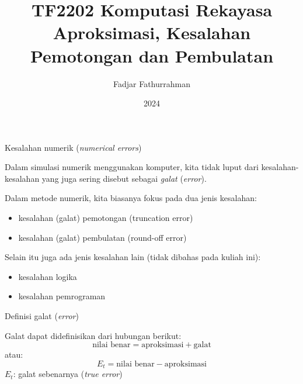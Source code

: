 

\title{TF2202 Komputasi Rekayasa\\
Aproksimasi, Kesalahan Pemotongan dan Pembulatan}
\author{Fadjar Fathurrahman}
\date{2024}



\frame{\titlepage}

\begin{frame}{Kesalahan numerik (\textit{numerical errors})}

Dalam simulasi numerik menggunakan komputer, kita tidak luput dari
kesalahan-kesalahan yang juga sering disebut sebagai
\emph{galat} (\emph{error}).

Dalam metode numerik, kita biasanya fokus pada dua jenis kesalahan:
\begin{itemize}\tightlist
\item kesalahan (galat) pemotongan (truncation error)
\item kesalahan (galat) pembulatan (round-off error)
\end{itemize}

Selain itu juga ada jenis kesalahan lain (tidak dibahas
pada kuliah ini):
\begin{itemize}
\item kesalahan logika
\item kesalahan pemrograman
\end{itemize}

\end{frame}



\begin{frame}{Definisi galat (\textit{error})}

Galat dapat didefinisikan dari hubungan berikut:
\begin{equation*}
\text{nilai benar} = \text{aproksimasi} + \text{galat}
\end{equation*}
atau:
\begin{equation*}
E_{t} = \text{nilai benar} - \text{aproksimasi}
\end{equation*}
$E_t$: galat sebenarnya (\textit{true error})

\end{frame}


